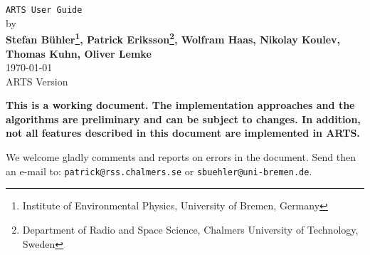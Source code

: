 %
%
\newcommand{\artsstyle}[1]      {\texttt{#1}}



%
%
\newcommand{\textindex}[1]   {#1\index{#1}}  
%
\newcommand{\wsfindex}[1]    {\artsstyle{#1}\index{workspace functions!#1}}  
%
\newcommand{\wsvindex}[1]    {\artsstyle{#1}\index{workspace variables!#1}}  
%
\newcommand{\fileindex}[1]   {\artsstyle{#1}\index{ARTS files!#1}}
%
\newcommand{\funcindex}[1]   {\artsstyle{#1}\index{internal ARTS functions!#1}}
%
\newcommand{\structindex}[1] {\artsstyle{#1}\index{data structures!#1}}










%
%
\thispagestyle{plain}
\begin{center}
  \vspace*{2cm}
  {\Huge \verb|ARTS User Guide|\\}
  \vspace*{1cm}
  {\large by \\}
  \vspace*{1cm}
  {\large \bf Stefan B\"uhler\footnote{Institute of Environmental
      Physics, University of Bremen, Germany}, Patrick
    Eriksson\footnote{Department of Radio and Space Science, Chalmers
    University of Technology, Sweden}, Wolfram Haas, Nikolay
    Koulev\footnotemark[1], Thomas Kuhn\footnotemark[1], Oliver
    Lemke\footnotemark[1]}\\
   \vspace*{2cm}
   {\large \today\\
    ARTS Version 
   }
\end{center}
  \vspace*{4cm}
{\normalsize \bf
  \noindent
  This is a working document. The implementation approaches and the
  algorithms are preliminary and can be subject to changes. In addition,
  not all features described in this document are implemented in ARTS.
  
  We welcome gladly comments and reports on errors in the document.
  Send then an e-mail to: \verb|patrick@rss.chalmers.se| or 
  \verb|sbuehler@uni-bremen.de|.
}

